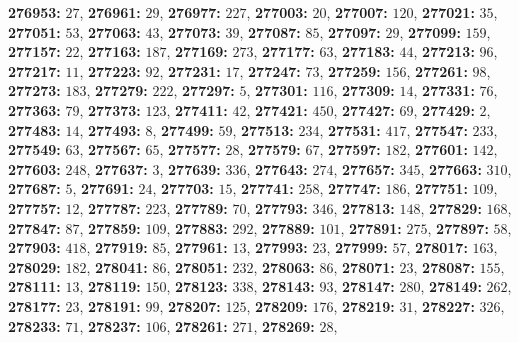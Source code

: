\textsf{\bfseries 276953:} $27$, \textsf{\bfseries 276961:} $29$, \textsf{\bfseries 276977:} $227$, \textsf{\bfseries 277003:} $20$, \textsf{\bfseries 277007:} $120$, \textsf{\bfseries 277021:} $35$, \textsf{\bfseries 277051:} $53$, \textsf{\bfseries 277063:} $43$, \textsf{\bfseries 277073:} $39$, \textsf{\bfseries 277087:} $85$, \textsf{\bfseries 277097:} $29$, \textsf{\bfseries 277099:} $159$, \textsf{\bfseries 277157:} $22$, \textsf{\bfseries 277163:} $187$, \textsf{\bfseries 277169:} $273$, \textsf{\bfseries 277177:} $63$, \textsf{\bfseries 277183:} $44$, \textsf{\bfseries 277213:} $96$, \textsf{\bfseries 277217:} $11$, \textsf{\bfseries 277223:} $92$, \textsf{\bfseries 277231:} $17$, \textsf{\bfseries 277247:} $73$, \textsf{\bfseries 277259:} $156$, \textsf{\bfseries 277261:} $98$, \textsf{\bfseries 277273:} $183$, \textsf{\bfseries 277279:} $222$, \textsf{\bfseries 277297:} $5$, \textsf{\bfseries 277301:} $116$, \textsf{\bfseries 277309:} $14$, \textsf{\bfseries 277331:} $76$, \textsf{\bfseries 277363:} $79$, \textsf{\bfseries 277373:} $123$, \textsf{\bfseries 277411:} $42$, \textsf{\bfseries 277421:} $450$, \textsf{\bfseries 277427:} $69$, \textsf{\bfseries 277429:} $2$, \textsf{\bfseries 277483:} $14$, \textsf{\bfseries 277493:} $8$, \textsf{\bfseries 277499:} $59$, \textsf{\bfseries 277513:} $234$, \textsf{\bfseries 277531:} $417$, \textsf{\bfseries 277547:} $233$, \textsf{\bfseries 277549:} $63$, \textsf{\bfseries 277567:} $65$, \textsf{\bfseries 277577:} $28$, \textsf{\bfseries 277579:} $67$, \textsf{\bfseries 277597:} $182$, \textsf{\bfseries 277601:} $142$, \textsf{\bfseries 277603:} $248$, \textsf{\bfseries 277637:} $3$, \textsf{\bfseries 277639:} $336$, \textsf{\bfseries 277643:} $274$, \textsf{\bfseries 277657:} $345$, \textsf{\bfseries 277663:} $310$, \textsf{\bfseries 277687:} $5$, \textsf{\bfseries 277691:} $24$, \textsf{\bfseries 277703:} $15$, \textsf{\bfseries 277741:} $258$, \textsf{\bfseries 277747:} $186$, \textsf{\bfseries 277751:} $109$, \textsf{\bfseries 277757:} $12$, \textsf{\bfseries 277787:} $223$, \textsf{\bfseries 277789:} $70$, \textsf{\bfseries 277793:} $346$, \textsf{\bfseries 277813:} $148$, \textsf{\bfseries 277829:} $168$, \textsf{\bfseries 277847:} $87$, \textsf{\bfseries 277859:} $109$, \textsf{\bfseries 277883:} $292$, \textsf{\bfseries 277889:} $101$, \textsf{\bfseries 277891:} $275$, \textsf{\bfseries 277897:} $58$, \textsf{\bfseries 277903:} $418$, \textsf{\bfseries 277919:} $85$, \textsf{\bfseries 277961:} $13$, \textsf{\bfseries 277993:} $23$, \textsf{\bfseries 277999:} $57$, \textsf{\bfseries 278017:} $163$, \textsf{\bfseries 278029:} $182$, \textsf{\bfseries 278041:} $86$, \textsf{\bfseries 278051:} $232$, \textsf{\bfseries 278063:} $86$, \textsf{\bfseries 278071:} $23$, \textsf{\bfseries 278087:} $155$, \textsf{\bfseries 278111:} $13$, \textsf{\bfseries 278119:} $150$, \textsf{\bfseries 278123:} $338$, \textsf{\bfseries 278143:} $93$, \textsf{\bfseries 278147:} $280$, \textsf{\bfseries 278149:} $262$, \textsf{\bfseries 278177:} $23$, \textsf{\bfseries 278191:} $99$, \textsf{\bfseries 278207:} $125$, \textsf{\bfseries 278209:} $176$, \textsf{\bfseries 278219:} $31$, \textsf{\bfseries 278227:} $326$, \textsf{\bfseries 278233:} $71$, \textsf{\bfseries 278237:} $106$, \textsf{\bfseries 278261:} $271$, \textsf{\bfseries 278269:} $28$, 
